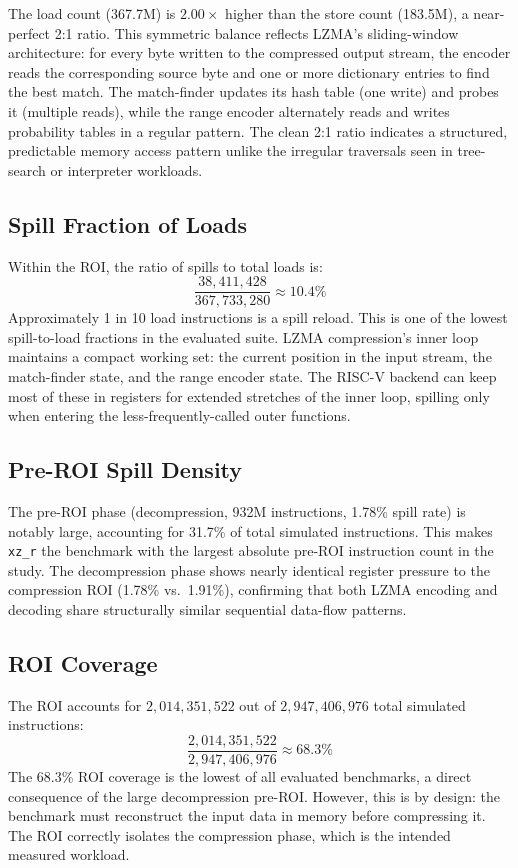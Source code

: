 \documentclass[conference]{IEEEtran}
\begin{document}
The load count (367.7M) is $2.00\times$ higher than the store count
(183.5M), a near-perfect 2:1 ratio. This symmetric balance reflects
LZMA's sliding-window architecture: for every byte written to the
compressed output stream, the encoder reads the corresponding source
byte and one or more dictionary entries to find the best match.
The match-finder updates its hash table (one write) and probes it
(multiple reads), while the range encoder alternately reads and writes
probability tables in a regular pattern. The clean 2:1 ratio indicates
a structured, predictable memory access pattern unlike the irregular
traversals seen in tree-search or interpreter workloads.

\subsection{Spill Fraction of Loads}

Within the ROI, the ratio of spills to total loads is:
\[
\frac{38{,}411{,}428}{367{,}733{,}280} \approx 10.4\%
\]
Approximately 1 in 10 load instructions is a spill reload. This is
one of the lowest spill-to-load fractions in the evaluated suite.
LZMA compression's inner loop maintains a compact working set: the
current position in the input stream, the match-finder state, and
the range encoder state. The RISC-V backend can keep most of these
in registers for extended stretches of the inner loop, spilling only
when entering the less-frequently-called outer functions.

\subsection{Pre-ROI Spill Density}

The pre-ROI phase (decompression, 932M instructions, 1.78\% spill
rate) is notably large, accounting for 31.7\% of total simulated
instructions. This makes \texttt{xz\_r} the benchmark with the
largest absolute pre-ROI instruction count in the study. The
decompression phase shows nearly identical register pressure to
the compression ROI (1.78\% vs.\ 1.91\%), confirming that both
LZMA encoding and decoding share structurally similar sequential
data-flow patterns.

\subsection{ROI Coverage}

The ROI accounts for $2{,}014{,}351{,}522$ out of $2{,}947{,}406{,}976$
total simulated instructions:
\[
\frac{2{,}014{,}351{,}522}{2{,}947{,}406{,}976} \approx 68.3\%
\]
The 68.3\% ROI coverage is the lowest of all evaluated benchmarks,
a direct consequence of the large decompression pre-ROI. However,
this is by design: the benchmark must reconstruct the input data
in memory before compressing it. The ROI correctly isolates the
compression phase, which is the intended measured workload.
\end{document}
